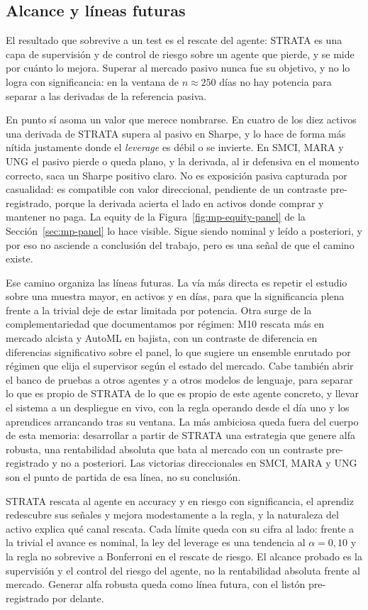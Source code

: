 \subsection{Alcance y líneas futuras}
\label{sec:mp-lim-futuro}

El resultado que sobrevive a un test es el rescate del agente: STRATA es una capa de supervisión y de control de riesgo sobre un agente que pierde, y se mide por cuánto lo mejora. Superar al mercado pasivo nunca fue su objetivo, y no lo logra con significancia: en la ventana de $n \approx 250$ días no hay potencia para separar a las derivadas de la referencia pasiva.

En punto sí asoma un valor que merece nombrarse. En cuatro de los diez activos una derivada de STRATA supera al pasivo en Sharpe, y lo hace de forma más nítida justamente donde el \emph{leverage} es débil o se invierte. En SMCI, MARA y UNG el pasivo pierde o queda plano, y la derivada, al ir defensiva en el momento correcto, saca un Sharpe positivo claro. No es exposición pasiva capturada por casualidad: es compatible con valor direccional, pendiente de un contraste pre-registrado, porque la derivada acierta el lado en activos donde comprar y mantener no paga. La equity de la Figura~\ref{fig:mp-equity-panel} de la Sección~\ref{sec:mp-panel} lo hace visible. Sigue siendo nominal y leído a posteriori, y por eso no asciende a conclusión del trabajo, pero es una señal de que el camino existe.

Ese camino organiza las líneas futuras. La vía más directa es repetir el estudio sobre una muestra mayor, en activos y en días, para que la significancia plena frente a la trivial deje de estar limitada por potencia. Otra surge de la complementariedad que documentamos por régimen: M10 rescata más en mercado alcista y AutoML en bajista, con un contraste de diferencia en diferencias significativo sobre el panel, lo que sugiere un ensemble enrutado por régimen que elija el supervisor según el estado del mercado. Cabe también abrir el banco de pruebas a otros agentes y a otros modelos de lenguaje, para separar lo que es propio de STRATA de lo que es propio de este agente concreto, y llevar el sistema a un despliegue en vivo, con la regla operando desde el día uno y los aprendices arrancando tras su ventana. La más ambiciosa queda fuera del cuerpo de esta memoria: desarrollar a partir de STRATA una estrategia que genere alfa robusta, una rentabilidad absoluta que bata al mercado con un contraste pre-registrado y no a posteriori. Las victorias direccionales en SMCI, MARA y UNG son el punto de partida de esa línea, no su conclusión.

STRATA rescata al agente en accuracy y en riesgo con significancia, el aprendiz redescubre sus señales y mejora modestamente a la regla, y la naturaleza del activo explica qué canal rescata. Cada límite queda con su cifra al lado: frente a la trivial el avance es nominal, la ley del leverage es una tendencia al $\alpha = 0{,}10$ y la regla no sobrevive a Bonferroni en el rescate de riesgo. El alcance probado es la supervisión y el control del riesgo del agente, no la rentabilidad absoluta frente al mercado. Generar alfa robusta queda como línea futura, con el listón pre-registrado por delante.
